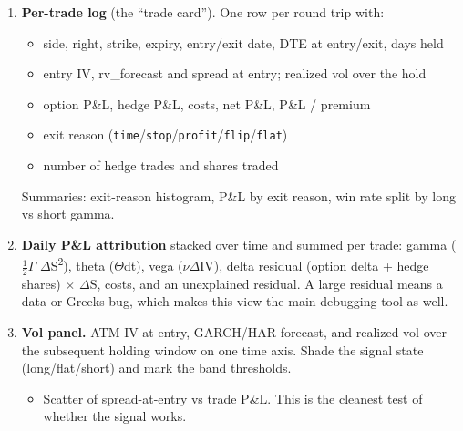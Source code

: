 \documentclass{article}
\begin{document}
\begin{enumerate}

\item \textbf{Per-trade log} (the ``trade card''). One row per round trip with:

\begin{itemize}

\item side, right, strike, expiry, entry/\allowbreak{}exit date, DTE at entry/\allowbreak{}exit, days held

\item entry IV, rv\_forecast and spread at entry; realized vol over the hold

\item option P\&L, hedge P\&L, costs, net P\&L, P\&L /\allowbreak{} premium

\item exit reason (\texttt{time}/\allowbreak{}\texttt{stop}/\allowbreak{}\texttt{profit}/\allowbreak{}\texttt{flip}/\allowbreak{}\texttt{flat})

\item number of hedge trades and shares traded

\end{itemize}

Summaries: exit-reason histogram, P\&L by exit reason, win rate split by long vs short gamma.

\item \textbf{Daily P\&L attribution} stacked over time and summed per trade: gamma (\ensuremath{\frac12}\ensuremath{\Gamma} \ensuremath{\Delta}S\textsuperscript{2}), theta (\ensuremath{\Theta}\textperiodcentered{}dt), vega (\ensuremath{\nu}\textperiodcentered{}\ensuremath{\Delta}IV), delta residual (option delta + hedge shares) \ensuremath{\times} \ensuremath{\Delta}S, costs, and an unexplained residual. A large residual means a data or Greeks bug, which makes this view the main debugging tool as well.

\item \textbf{Vol panel.} ATM IV at entry, GARCH/\allowbreak{}HAR forecast, and realized vol over the subsequent holding window on one time axis. Shade the signal state (long/\allowbreak{}flat/\allowbreak{}short) and mark the band thresholds.

\begin{itemize}

\item Scatter of spread-at-entry vs trade P\&L. This is the cleanest test of whether the signal works.


\end{itemize}
\end{enumerate}
\end{document}

